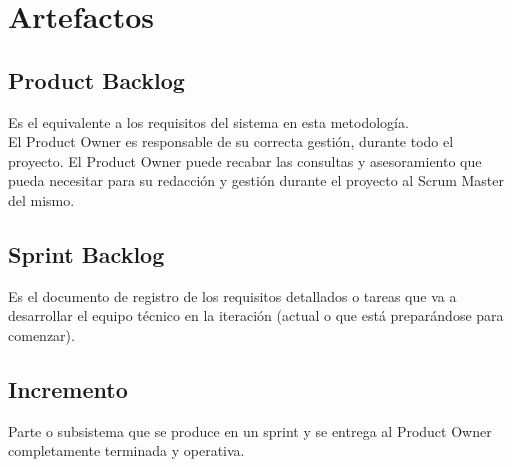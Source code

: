 \documentclass[a4paper,oneside,10pt]{article}
\begin{document}
\section{Artefactos}

\subsection{Product Backlog}
Es el equivalente a los requisitos del sistema en esta metodología.\\
El Product Owner es responsable de su correcta gestión, durante todo el proyecto.
El Product Owner puede recabar las consultas y asesoramiento que pueda necesitar para su redacción y gestión durante el proyecto al Scrum Master del mismo.

\subsection{Sprint Backlog}
Es el documento de registro de los requisitos detallados o tareas que va a desarrollar el equipo técnico en la iteración (actual o que está preparándose para comenzar).

\subsection{Incremento}

Parte o subsistema que se produce en un sprint y se entrega al Product Owner completamente terminada y operativa.
\end{document}
